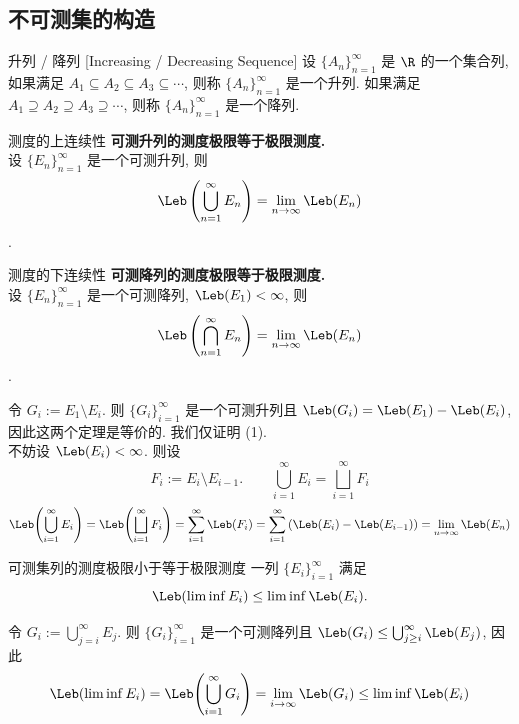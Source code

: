 \subsection{不可测集的构造}
\begin{dfn}
    {升列 / 降列}
    [Increasing / Decreasing Sequence]
    设 \(\{A_n\}_{n=1}^\infty\) 是 \(\R\) 的一个集合列, 如果满足 \(A_1 \subseteq A_2 \subseteq A_3 \subseteq \cdots\), 则称 \(\{A_n\}_{n=1}^\infty\) 是一个升列. 
    如果满足 \(A_1 \supseteq A_2 \supseteq A_3 \supseteq \cdots\), 则称 \(\{A_n\}_{n=1}^\infty\) 是一个降列.
\end{dfn}
\begin{ppt}
    {测度的上连续性}
    \textbf{可测升列的测度极限等于极限测度.}\\
    设 \(\{E_n\}_{n=1}^\infty\) 是一个可测升列, 则 
    \[\Leb\left(\bigcup_{n=1}^\infty E_n\right) = \lim_{n\to\infty} \Leb(E_n)\].
\end{ppt}
\begin{ppt}
    {测度的下连续性}
    \textbf{可测降列的测度极限等于极限测度.}\\
    设 \(\{E_n\}_{n=1}^\infty\) 是一个可测降列, \(\Leb(E_1)<\infty\), 则 
    \[\Leb\left(\bigcap_{n=1}^\infty E_n\right) = \lim_{n\to\infty} \Leb(E_n)\].
\end{ppt}
\begin{prf}
    令 \(G_i:=E_1\setminus E_i\). 则 \(\{G_i\}_{i=1}^\infty\) 是一个可测升列且 \(\Leb(G_i)=\Leb(E_1)-\Leb(E_i)\), 因此这两个定理是等价的. 我们仅证明 (1).\\
    不妨设 \(\Leb(E_i)<\infty\). 则设 
    \[F_i:=E_i\setminus E_{i-1}. \qquad \bigcup_{i=1}^{\infty}E_i=\bigsqcup_{i=1}^{\infty}F_i\]
    \[\Leb\qty(\bigcup_{i=1}^{\infty}E_i)=\Leb\qty(\bigsqcup_{i=1}^{\infty}F_i)=\sum_{i=1}^{\infty}\Leb(F_i)=\sum_{i=1}^{\infty}\qty(\Leb(E_i)-\Leb(E_{i-1}))=\lim_{n\to\infty} \Leb(E_n)\]
\end{prf}
\begin{crl}
    {可测集列的测度极限小于等于极限测度}
    一列\MeasurableSet{} \(\{E_i\}_{i=1}^\infty\) 满足
    \[\Leb(\liminf E_i)\leq \liminf \Leb(E_i).\]
\end{crl}
\begin{prf}
    令 \(G_i:=\bigcup_{j=i}^\infty E_j\). 则 \(\{G_i\}_{i=1}^\infty\) 是一个可测降列且 \(\Leb(G_i)\leq \bigcup_{j\geq i}^\infty \Leb(E_j)\), 因此
    \[\Leb(\liminf E_i)=\Leb\qty(\bigcup_{i=1}^\infty G_i)=\lim_{i\to\infty} \Leb(G_i)\leq \liminf \Leb(E_i)\]
\end{prf}
